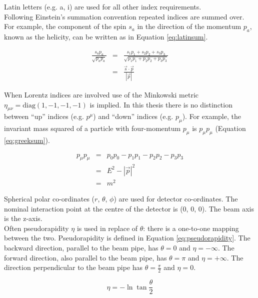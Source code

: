 Latin letters (e.g. a, i) are used for all other index requirements. \\

Following Einstein's summation convention repeated indices are summed over. For 
example, the component of the spin $s_{a}$ in the direction of the momentum 
$p_{a}$, known as the helicity, can be written as in Equation \ref{eq:latinsum}.

\begin{eqnarray}
\frac{s_{a}p_{a}}{\sqrt{p_{a}p_{a}}} &=& \frac{s_{1}p_{1} + s_{2}p_{2} + s_{3}p_{3}}
{\sqrt{p_{1}p_{1} + p_{2}p_{2} + p_{3}p_{3}}} \nonumber \\
&=& \frac{\vec{s}\cdot\vec{p}}{|\vec{p}|}
\label{eq:latinsum}
\end{eqnarray}

When Lorentz indices are involved use of the Minkowski metric $\eta_{\mu\nu} =
\mathrm{diag}(1, -1, -1, -1)$ is implied. In this thesis there is no distinction 
between ``up'' indices (e.g. $p^{\mu}$) and ``down'' indices (e.g. $p_{\mu}$). 
For example, the invariant mass squared of a particle with four-momentum 
$p_{\mu}$ is $p_{\mu}p_{\mu}$ (Equation \ref{eq:greeksum}). 

\begin{eqnarray}
p_{\mu}p_{\mu} &=& p_{0}p_{0} - p_{1}p_{1} - p_{2}p_{2} - p_{3}p_{3} \nonumber
\\
&=& E^{2} - |\vec{p}|^{2} \nonumber \\
&=& m^{2}
\label{eq:greeksum}
\end{eqnarray}

Spherical polar co-ordinates ($r$, $\theta$, $\phi$) are used for detector
co-ordinates. The nominal interaction point at the centre of the detector is 
(0, 0, 0). The beam axis is the z-axis. \\

Often pseudorapidity $\eta$ is used in replace of $\theta$: there is a 
one-to-one mapping between the two. Pseudorapidity is defined in Equation 
\ref{eq:pseudorapidity}. The backward direction, parallel to the beam pipe, has 
$\theta = 0$ and $\eta = -\infty$. The forward direction, also parallel to the
beam pipe, has $\theta = \pi$ and $\eta = +\infty$. The direction perpendicular 
to the beam pipe has $\theta = \frac{\pi}{2}$ and $\eta = 0$. 

\begin{equation}
\eta = -\ln\tan\frac{\theta}{2}
\label{eq:pseudorapidity}
\end{equation}


